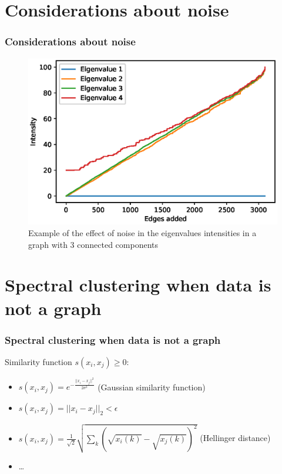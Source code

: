 \documentclass{beamer}
\begin{document}
\section{Considerations about noise}
\begin{frame}
  \frametitle{Considerations about noise}
  \begin{figure}
    \centering
    \includegraphics[width=0.5\linewidth]{figures/adding-noise.eps}
    \caption{Example of the effect of noise in the eigenvalues intensities in a graph with 3 connected components}
    \label{figure:addingnoise}
  \end{figure}
\end{frame}

\section{Spectral clustering when data is not a graph}
\begin{frame}
  \frametitle{Spectral clustering when data is not a graph}
  Similarity function $s(x_i, x_j) \geq 0$:
  \begin{itemize}
    \item $s(x_i, x_j) = e^{ - \frac{||x_i - x_j||^2}{2\sigma^2}}$ (Gaussian similarity function)
    \item $s(x_i, x_j) = ||x_i - x_j||_2 < \epsilon$
    \item $s(x_i, x_j) = \frac{1}{\sqrt{2}} \sqrt{\sum_k (\sqrt{x_i(k)} - \sqrt{x_j(k)})^2}$ (Hellinger distance)
    \item \dots
  \end{itemize}

\end{frame}
\end{document}
